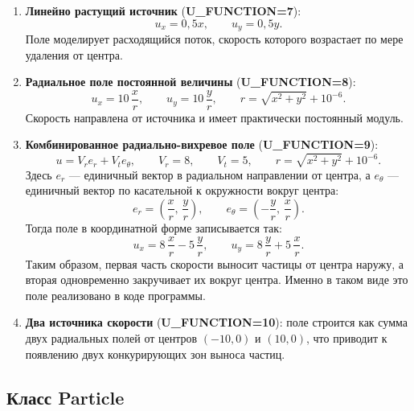 \documentclass[14pt,a4paper]{extarticle}
\numberwithin{figure}{section}
\numberwithin{table}{section}
\begin{document}
\begin{enumerate}
    \item \textbf{Линейно растущий источник} (\textbf{U\_FUNCTION=7}):
    \begin{equation}
        u_x = 0{,}5x, \qquad u_y = 0{,}5y.
    \end{equation}
    Поле моделирует расходящийся поток, скорость которого возрастает по мере удаления от центра.

    \item \textbf{Радиальное поле постоянной величины} (\textbf{U\_FUNCTION=8}):
    \begin{equation}
        u_x = 10\,\frac{x}{r}, \qquad u_y = 10\,\frac{y}{r},
        \qquad r = \sqrt{x^2 + y^2} + 10^{-6}.
    \end{equation}
    Скорость направлена от источника и имеет практически постоянный модуль.

    \item \textbf{Комбинированное радиально-вихревое поле} (\textbf{U\_FUNCTION=9}):
    \begin{equation}
        u = V_r e_r + V_t e_\theta, \qquad V_r = 8, \qquad V_t = 5,
        \qquad r = \sqrt{x^2 + y^2} + 10^{-6}.
    \end{equation}
    Здесь $e_r$ --- единичный вектор в радиальном направлении от центра,
    а $e_\theta$ --- единичный вектор по касательной к окружности вокруг центра:
    \begin{equation}
        e_r = \left(\frac{x}{r},\,\frac{y}{r}\right), \qquad
        e_\theta = \left(-\frac{y}{r},\,\frac{x}{r}\right).
    \end{equation}
    Тогда поле в координатной форме записывается так:
    \begin{equation}
        u_x = 8\,\frac{x}{r} - 5\,\frac{y}{r}, \qquad
        u_y = 8\,\frac{y}{r} + 5\,\frac{x}{r}.
    \end{equation}
    Таким образом, первая часть скорости выносит частицы от центра наружу,
    а вторая одновременно закручивает их вокруг центра. Именно в таком виде
    это поле реализовано в коде программы.

    \item \textbf{Два источника скорости} (\textbf{U\_FUNCTION=10}):
    поле строится как сумма двух радиальных полей от центров $(-10,0)$ и $(10,0)$,
    что приводит к появлению двух конкурирующих зон выноса частиц.
\end{enumerate}

\subsection{Класс \textbf{Particle}}
\end{document}
